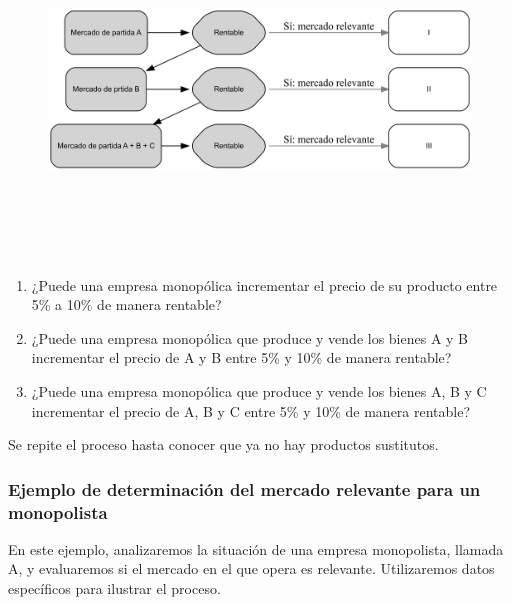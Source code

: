 \documentclass[
  a4paper,
]{article}
\begin{document}
\begin{figure}[H]

{\centering \includegraphics[width=5.5in,height=3.5in]{index_files/figure-latex/dot-figure-1.png}

}

\end{figure}

\begin{enumerate}
\def\labelenumi{\arabic{enumi}.}
\item
  ¿Puede una empresa monopólica incrementar el precio de su producto
  entre 5\% a 10\% de manera rentable?
\item
  ¿Puede una empresa monopólica que produce y vende los bienes A y B
  incrementar el precio de A y B entre 5\% y 10\% de manera rentable?
\item
  ¿Puede una empresa monopólica que produce y vende los bienes A, B y C
  incrementar el precio de A, B y C entre 5\% y 10\% de manera rentable?
\end{enumerate}

Se repite el proceso hasta conocer que ya no hay productos sustitutos.

\hypertarget{ejemplo-de-determinaciuxf3n-del-mercado-relevante-para-un-monopolista}{%
\subsubsection{Ejemplo de determinación del mercado relevante para un
monopolista}\label{ejemplo-de-determinaciuxf3n-del-mercado-relevante-para-un-monopolista}}

En este ejemplo, analizaremos la situación de una empresa monopolista,
llamada A, y evaluaremos si el mercado en el que opera es relevante.
Utilizaremos datos específicos para ilustrar el proceso.
\end{document}
